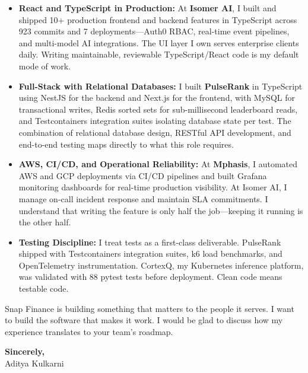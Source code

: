 \documentclass[11pt,letterpaper]{article}
\begin{document}
\begin{itemize}[leftmargin=*, itemsep=6pt, label={\color{SnapGreen}\faAngleRight}]
    \item \textbf{React and TypeScript in Production:} At \textbf{Isomer AI}, I built and shipped 10+ production frontend and backend features in TypeScript across 923 commits and 7 deployments---Auth0 RBAC, real-time event pipelines, and multi-model AI integrations. The UI layer I own serves enterprise clients daily. Writing maintainable, reviewable TypeScript/React code is my default mode of work.

    \item \textbf{Full-Stack with Relational Databases:} I built \textbf{PulseRank} in TypeScript using NestJS for the backend and Next.js for the frontend, with MySQL for transactional writes, Redis sorted sets for sub-millisecond leaderboard reads, and Testcontainers integration suites isolating database state per test. The combination of relational database design, RESTful API development, and end-to-end testing maps directly to what this role requires.

    \item \textbf{AWS, CI/CD, and Operational Reliability:} At \textbf{Mphasis}, I automated AWS and GCP deployments via CI/CD pipelines and built Grafana monitoring dashboards for real-time production visibility. At Isomer AI, I manage on-call incident response and maintain SLA commitments. I understand that writing the feature is only half the job---keeping it running is the other half.

    \item \textbf{Testing Discipline:} I treat tests as a first-class deliverable. PulseRank shipped with Testcontainers integration suites, k6 load benchmarks, and OpenTelemetry instrumentation. CortexQ, my Kubernetes inference platform, was validated with 88 pytest tests before deployment. Clean code means testable code.
\end{itemize}

\vspace{6pt}

Snap Finance is building something that matters to the people it serves. I want to build the software that makes it work. I would be glad to discuss how my experience translates to your team's roadmap.

\vspace{12pt}

\textbf{Sincerely,}\\[8pt]
Aditya Kulkarni
\end{document}
